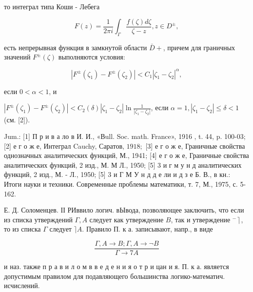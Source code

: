 \documentclass[10pt]{article}
\begin{document}
то интеграл типа Коши - Лебега



\[

F(z)=\frac{1}{2 \pi i} \int_{\Gamma} \frac{f(\zeta) d \zeta}{\zeta-z}, z \in D^{ \pm},

\]



есть непрерывная функция в замкнутой области $\bar{D}+$, причем для граничных значений $F^{ \pm}(\zeta)$ выполняются условия:



\[

\left|F^{ \pm}\left(\zeta_{1}\right)-F^{ \pm}\left(\zeta_{2}\right)\right|<C_{1}\left|\zeta_{1}-\zeta_{2}\right|^{\alpha},

\]



если $0<\alpha<1$, и



$\left|F^{ \pm}\left(\zeta_{1}\right)-F^{ \pm}\left(\zeta_{2}\right)\right|<C_{2}(\delta)\left|\zeta_{1}-\zeta_{2}\right| \ln \frac{1}{\left|\zeta_{1}-\zeta_{2}\right|}$, если $\alpha=1,\left|\zeta_{1}-\zeta_{2}\right| \leqslant \delta<1$ (см. [2]).



Jum.: [1] П р и в а ло в И. И., «Вull. Soc. math. France», 1916 , t. 44, p. 100-03; [2] е г о ж е, Интеграл Cauchy, Саратов, $1918 ;$ [3] е г о ж е, Граничные свойства однозначных аналитических функций, М., 1941; [4] е г о ж е, Граничные свойства аналитических функций, 2 изд., М. М Л., 1950; [5] 3 и г м у н д аналитических функций, 2 изд., М. - Л., 1950; [5] 3 и Г М У н д д е ли и д з е Б. В., в кн.: Итоги науки и техники. Современные проблемы математики, т. 7, М., 1975, с. 5-162.



Е. Д. Соломенцев. ІІ РИввило логич. вЫвода, позволяющее заключить, что если из списка утверждений $\Gamma, A$ следует как утверждение $B$, так и утверждение $\left.{ }^{-}\right\rceil$, то из списка $\Gamma$ следует $\rceil A$. Правило П. к а. записывают, напр., в виде



\[

\frac{\Gamma, A \rightarrow B ; \Gamma, A \rightarrow \neg B}{\Gamma \rightarrow 7 A}

\]



и наз. также п р а в и л о м в в е д е н и я о т р и цан и я. П. к а. является допустимым правилом для подавляющего большинства логико-математич. исчислений.
\end{document}
